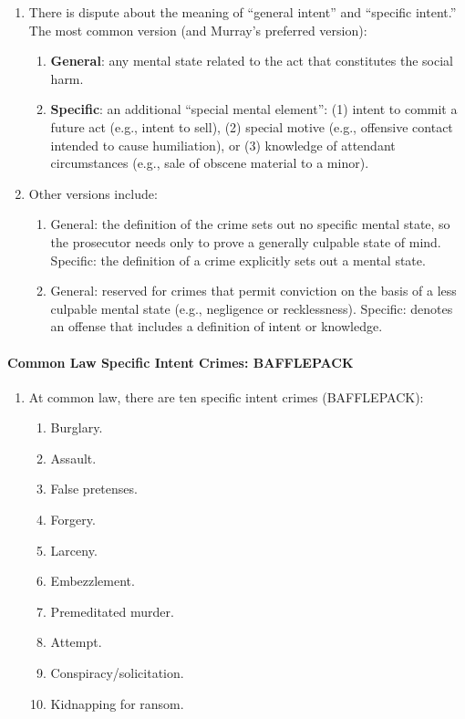 \begin{enumerate}
    \item There is dispute about the meaning of ``general intent'' and 
    ``specific intent.'' The most common version (and Murray's preferred 
    version):
    \begin{enumerate}
        \item \textbf{General}: any mental state related to the act that 
        constitutes the social harm.
        \item \textbf{Specific}: an additional ``special mental element'': (1) 
        intent to commit a future act (e.g., intent to sell), (2) special 
        motive (e.g., offensive contact intended to cause humiliation), or (3) 
        knowledge of attendant circumstances (e.g., sale of obscene material 
        to a minor).
    \end{enumerate}
    \item Other versions include:
    \begin{enumerate}
        \item General: the definition of the crime sets out no specific mental 
        state, so the prosecutor needs only to prove a generally culpable 
        state of mind. Specific: the definition of a crime explicitly sets out 
        a mental state.
        \item General: reserved for crimes that permit conviction on the basis 
        of a less culpable mental state (e.g., negligence or recklessness).  
        Specific: denotes an offense that includes a definition of intent or 
        knowledge.
    \end{enumerate}
\end{enumerate}

\paragraph{Common Law Specific Intent Crimes: BAFFLEPACK}

\begin{enumerate}
    \item At common law, there are ten specific intent crimes (BAFFLEPACK):
    \begin{enumerate}
        \item Burglary.
        \item Assault.
        \item False pretenses.
        \item Forgery.
        \item Larceny.
        \item Embezzlement.
        \item Premeditated murder.
        \item Attempt.
        \item Conspiracy/solicitation.
        \item Kidnapping for ransom.
    \end{enumerate}
\end{enumerate}

